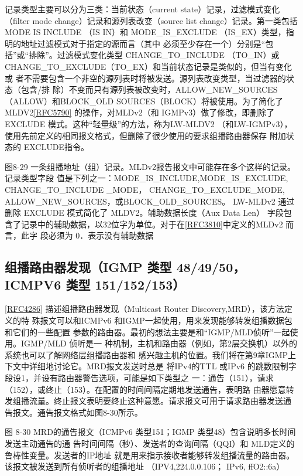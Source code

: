 记录类型主要可以分为三类：当前状态（current state）记录，过滤模式变化（filter mode
change）记录和源列表改变（source list change）记录。第一类包括 MODE IS INCLUDE （IS
IN）和 MODE\_IS\_EXCLUDE （IS\_EX）类型，指明的地址过滤模式对于指定的源而言（其中
必须至少存在一个）分别是“包括”或“排除”。过滤模式变化类型 CHANGE\_TO\_INCLUDE
（TO\_IN）或CHANGE\_TO\_EXCLUDE（TO\_EX）和当前状态记录是类似的，但当有变化或
者不需要包含一个非空的源列表时将被发送。源列表改变类型，当过滤器的状态（包含/排
除）不变而只有源列表被改变时，ALLOW\_NEW\_SOURCES（ALLOW）和BLOCK\_OLD
SOURCES（BLOCK）将被使用。为了简化了MLDV2\href{https://www.rfc-editor.org/rfc/rfc5790}{[RFC5790]} 的操作，对MLDv2（和
IGMPv3）做了修改，即删除了 EXCLUDE 模式。这种“轻量级”的方法，称为LW-MLDV2
（和LW-IGMPv3），使用先前定义的相同报文格式，但删除了很少使用的要求组播路由器保存
附加状态的 EXCLUDE指令。

图8-29 一条组播地址（组）记录。MLDv2报告报文中可能存在多个这样的记录。记录类型字段
值是下列之一：MODE\_IS\_INCLUDE,MODE\_IS\_EXCLUDE, CHANGE\_TO\_INCLUDE \_MODE，
CHANGE\_TO\_EXCLUDE\_MODE, ALLOW\_NEW\_SOURCES，或BLOCK\_OLD\_SOURCES。
LW-MLDv2 通过删除 EXCLUDE 模式简化了 MLDV2。辅助数据长度（Aux Data Len） 字段包
含了记录中的辅助数据，以32位字为单位。对于在\href{https://www.rfc-editor.org/rfc/rfc3810}{[RFC3810]}中定义的MLDv2 而言，此字
段必须为 0．表示没有辅助数据

\subsection{组播路由器发现（IGMP 类型 48/49/50，ICMPV6 类型 151/152/153）}
\href{https://www.rfc-editor.org/rfc/rfc4286}{[RFC4286]} 描述组播路由器发现（Multicast Router Discovery,MRD），该方法定义的特
殊报文可以和ICMPv6 和IGMP一起使用，用来发现能够转发组播数据包和它们的一些配置
参数的路由器。最初的想法主要是和“IGMP/MLD侦听”一起使用。IGMP/MLD 侦听是一
种机制，主机和路由器（例如，第2层交换机）以外的系统也可以了解网络层组播路由器和
感兴趣主机的位置。我们将在第9章IGMP上下文中详细地讨论它。MRD报文发送时总是
将IPv4的TTL 或IPv6 的跳数限制字段设1，并设有路由器警告选项，可能是如下类型之
一：通告（151），请求（152），或终止（153）。在配置的时间间隔定期地发送通告，表明路
由器愿意转发组播流量。终止报文表明要终止这种意愿。请求报文可用于请求路由器发送通
告报文。通告报文格式如图8-30所示。

图 8-30 MRD的通告报文（ICMPv6 类型151；IGMP 类型48）包含说明多长时间发送主动通告的通
告时间间隔（秒）、发送者的查询间隔（QQI）和 MLD定义的鲁棒性变量。发送者的IP地址
就是用来指示接收者能够转发组播流量的路由器。该报文被发送到所有侦听者的组播地址
（IPV4,224.0.0.106； IPv6, ffO2::6a）

